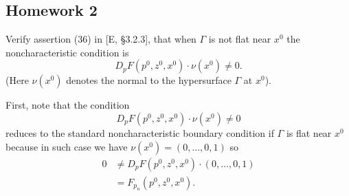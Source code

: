 \subsection{Homework 2}
\begin{problem}
  Verify assertion (36) in [E, \S 3.2.3], that when \(\Gamma\) is not flat
  near \(x^0\) the noncharacteristic condition is
  \[
    D_pF(p^0,z^0,x^0)\cdot \nu(x^0)\neq 0.
  \]
  (Here \(\nu(x^0)\) denotes the normal to the hypersurface \(\Gamma\) at
  \(x^0\)).
\end{problem}
\begin{solution}
  First, note that the condition
  \begin{equation}
    \label{eq:2-1}
    D_pF(p^0,z^0,x^0)\cdot \nu(x^0)\neq 0
  \end{equation}
  reduces to the standard noncharacteristic boundary condition if
  \(\Gamma\) is flat near \(x^0\) because in such case we have
  \(\nu(x^0)=(0,\dotsc,0,1)\) so
  \begin{align*}
    0&\neq D_pF(p^0,z^0,x^0)\cdot (0,\dotsc,0,1)\\
     &=F_{p_n}(p^0,z^0,x^0).
  \end{align*}


\end{solution}
